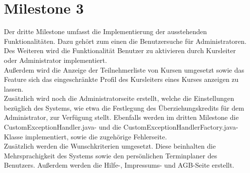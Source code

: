 \section{Milestone 3}

Der dritte Milestone umfasst die Implementierung der ausstehenden Funktionalitäten.
Dazu gehört zum einen die Benutzersuche für Administratoren.\\
Des Weiteren wird die Funktionalität Benutzer zu aktivieren durch Kursleiter oder Administrator implementiert. \\
Außerdem wird die Anzeige der Teilnehmerliste von Kursen umgesetzt sowie das Feature sich das eingeschränkte Profil des Kursleiters eines Kurses anzeigen zu lassen. \\
Zusätzlich wird noch die Administratorseite erstellt, welche die Einstellungen bezüglich des Systems, wie etwa die Festlegung des Überziehungskredits für dem Administrator, zur Verfügung stellt. 
Ebenfalls werden im dritten Milestone die CustomExceptionHandler.java- und die
CustomExceptionHandlerFactory.java-Klasse implementiert, sowie die zugehörige Fehlerseite.
\ \\
Zusätzlich werden die Wunschkriterien umgesetzt. Diese beinhalten
die Mehrsprachigkeit des Systems sowie den persönlichen Terminplaner des Benutzers. Außerdem werden die Hilfe-, Impressums- und AGB-Seite erstellt.

